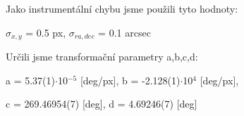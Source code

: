 \documentclass[a4paper,11pt]{article}
\begin{document}
\begin{minipage}[t]{0.5\textwidth}
                \par Jako instrumentální chybu jsme použili tyto hodnoty:
                \begin{center}
                    $\sigma_{x,y}$ = 0.5 px, $\sigma_{ra,dec}$ = 0.1 arcsec
                \end{center}

                \par Určili jsme transformační parametry a,b,c,d: 

                \begin{center}
                    a = 5.37(1)$\cdot$10$^{-5}$ [deg/px], b = -2.128(1)$\cdot$10$^{4}$ [deg/px],
                    \vspace{5pt}
                    \par c = 269.46954(7) [deg], d = 4.69246(7) [deg]
                \end{center}
    \end{minipage}
    \hspace{10pt}
\end{document}
